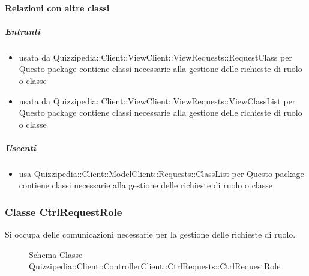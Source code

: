 \paragraph{Relazioni con altre classi}
\subparagraph{Entranti}
\begin{itemize}
\item usata da Quizzipedia::Client::ViewClient::ViewRequests::RequestClass per Questo package contiene classi necessarie alla gestione delle richieste di ruolo o classe
\item usata da Quizzipedia::Client::ViewClient::ViewRequests::ViewClassList per Questo package contiene classi necessarie alla gestione delle richieste di ruolo o classe
\end{itemize}
\subparagraph{Uscenti}
\begin{itemize}
\item usa Quizzipedia::Client::ModelClient::Requests::ClassList per Questo package contiene classi necessarie alla gestione delle richieste di ruolo o classe
\end{itemize}
\subsubsection{Classe CtrlRequestRole}
Si occupa delle comunicazioni necessarie per la gestione delle richieste di ruolo.
\begin{figure}[H]
\centering
\noindent{}
\caption[Schema Classe CtrlRequestRole]{Schema Classe Quizzipedia::Client::ControllerClient::CtrlRequests::CtrlRequestRole}
\end{figure}
